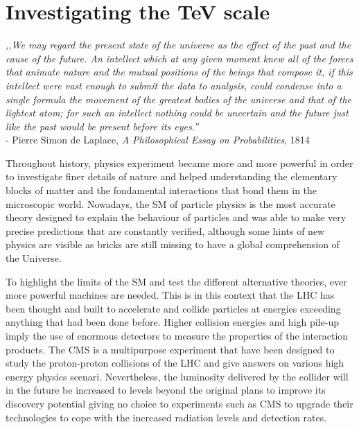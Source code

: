 \renewcommand\evenpagerightmark{{\scshape\small Chapter 2}}
\renewcommand\oddpageleftmark{{\scshape\small Investigating the \si{TeV} scale}}

\renewcommand{\bibname}{References}

\hyphenation{}

\chapter[Investigating the \si{TeV} scale]%
{Investigating the \si{TeV} scale}
\label{chapt:2}

	\vfill
	
	{\Large\textit{,,We may regard the present state of the universe as the effect of the past and the cause of the future. An intellect which at any given moment knew all of the forces that animate nature and the mutual positions of the beings that compose it, if this intellect were vast enough to submit the data to analysis, could condense into a single formula the movement of the greatest bodies of the universe and that of the lightest atom; for such an intellect nothing could be uncertain and the future just like the past would be present before its eyes.''}}\\
	
	{\normalsize\raggedleft - Pierre Simon de Laplace, \textit{A Philosophical Essay on Probabilities}, 1814}
	
	\vfill
	
\newpage

	Throughout history, physics experiment became more and more powerful in order to investigate finer details of nature and helped understanding the elementary blocks of matter and the fondamental interactions that bond them in the microscopic world. Nowadays, the \acf{SM} of particle physics is the most accurate theory designed to explain the behaviour of particles and was able to make very precise predictions that are constantly verified, although some hints of new physics are visible as bricks are still missing to have a global comprehension of the Universe.
	
	To highlight the limits of the SM and test the different alternative theories, ever more powerful machines are needed. This is in this context that the \acf{LHC} has been thought and built to accelerate and collide particles at energies exceeding anything that had been done before. Higher collision energies and high pile-up imply the use of enormous detectors to measure the properties of the interaction products. The \acf{CMS} is a multipurpose experiment that have been designed to study the proton-proton collisions of the LHC and give answers on various high energy physics scenari. Nevertheless, the luminosity delivered by the collider will in the future be increased to levels beyond the original plans to improve its discovery potential giving no choice to experiments such as CMS to upgrade their technologies to cope with the increased radiation levels and detection rates.

